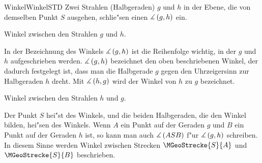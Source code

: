 \begin{MXContent}{Winkel}{Winkel}{STD}
Zwei Strahlen (Halbgeraden) $g$ und $h$ in der Ebene, die von demselben Punkt 
$S$ ausgehen, schlie"sen einen  
$\measuredangle\left(g, h\right)$ ein.

\begin{center}
\par
Winkel zwischen den Strahlen $g$ und $h$.
\end{center}

In der Bezeichnung des Winkels $\measuredangle \left( g, h \right)$ ist die 
Reihenfolge wichtig, in der $g$ und $h$ aufgeschrieben werden.
$\measuredangle \left( g, h \right)$ bezeichnet den oben beschriebenen 
Winkel, der dadurch festgelegt ist, dass man die Halbgerade $g$ gegen 
den Uhrzeigersinn zur Halbgeraden $h$ dreht.
Mit $\measuredangle \left( h, g \right)$ wird der Winkel von $h$ zu $g$ 
bezeichnet.

\begin{center}
\par
Winkel zwischen den Strahlen $h$ und $g$.
\end{center}

Der Punkt $S$ hei"st  des 
Winkels, und die beiden Halbgeraden, die den Winkel bilden, hei"sen 
 des Winkels.
Wenn $A$ ein Punkt auf der Geraden $g$ und $B$ ein Punkt auf der Geraden $h$
ist, so kann man auch $\measuredangle \left( A S B \right)$ f"ur 
$\measuredangle \left( g, h \right)$ schreiben. In diesem Sinne werden 
Winkel zwischen Strecken $\MGeoStrecke{S}{A}$ und $\MGeoStrecke{S}{B}$
beschrieben.


\end{MXContent}
